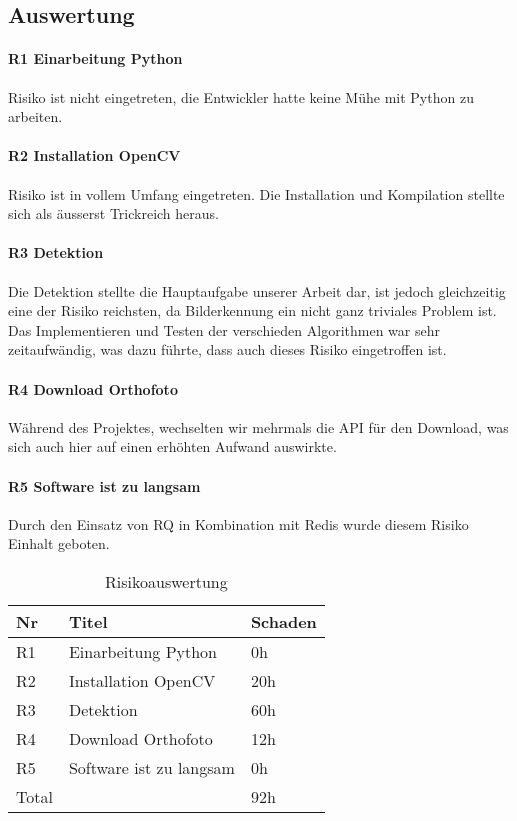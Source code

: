 \subsection{Auswertung}
\paragraph{R1	Einarbeitung Python}
Risiko ist nicht eingetreten, die Entwickler hatte keine Mühe mit Python zu arbeiten.

\paragraph{R2 Installation OpenCV}
Risiko ist in vollem Umfang eingetreten. Die Installation und Kompilation stellte sich als äusserst Trickreich heraus.

\paragraph{R3 Detektion}
Die Detektion stellte die Hauptaufgabe unserer Arbeit dar, ist jedoch gleichzeitig eine der Risiko reichsten, da Bilderkennung ein nicht ganz triviales Problem ist. Das Implementieren und Testen der verschieden Algorithmen war sehr zeitaufwändig, was dazu führte, dass auch dieses Risiko eingetroffen ist.

\paragraph{R4 Download Orthofoto}
Während des Projektes, wechselten wir mehrmals die API für den Download, was sich auch hier auf einen erhöhten Aufwand auswirkte. 

\paragraph{R5 Software ist zu langsam}
Durch den Einsatz von RQ in Kombination mit Redis wurde diesem Risiko Einhalt geboten. \\

\begin{table}[H]
	\centering
    \begin{tabular}{|p{2cm}|p{5cm}|p{2cm}|}
    \hline    
    \rowcolor{lightblue}
	Nr & Titel & Schaden \\ \hline   
	R1 & Einarbeitung Python & 0h \\ \hline
	R2 & Installation OpenCV & 20h \\ \hline
	R3 & Detektion & 60h \\ \hline
	R4 & Download Orthofoto & 12h \\ \hline
	R5 & Software ist zu langsam & 0h \\ \hline
	\rowcolor{lightblue}
	Total &  & 92h \\ \hline
    \end{tabular}
    \caption[Risikoauswertung]{Risikoauswertung}
\end{table}